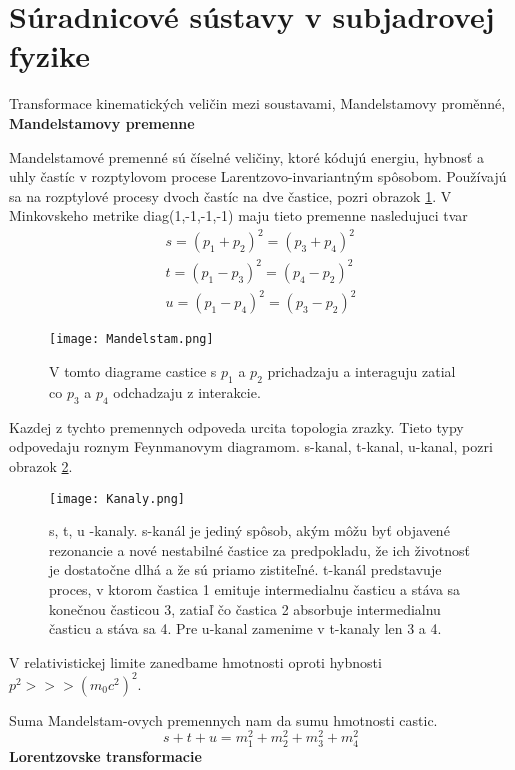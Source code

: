 \documentclass[../../main.tex]{subfiles}
\begin{document}
\section{Súradnicové sústavy v subjadrovej fyzike}
Transformace kinematických veličin mezi soustavami, Mandelstamovy proměnné,\newline
\textbf{Mandelstamovy premenne}\par
Mandelstamové premenné sú číselné veličiny, ktoré kódujú energiu, hybnosť a uhly častíc v rozptylovom procese Larentzovo-invariantným spôsobom. Používajú sa na rozptylové procesy dvoch častíc na dve častice, pozri obrazok \ref{sf1:fig:Mandelstam}. V Minkovskeho metrike diag(1,-1,-1,-1) maju tieto premenne nasledujuci tvar
\begin{equation}
\begin{gathered}
s=(p_1+p_2)^2=(p_3+p_4)^2 \\
t=(p_1-p_3)^2=(p_4-p_2)^2 \\
u=(p_1-p_4)^2=(p_3-p_2)^2
\end{gathered}
\end{equation}
\begin{figure}[!h]
\centering
\texttt{[image: Mandelstam.png]}
\caption{V tomto diagrame castice s $p_1$ a $p_2$ prichadzaju a interaguju zatial co $p_3$ a $p_4$ odchadzaju z interakcie.}
\label{sf1:fig:Mandelstam}
\end{figure}
Kazdej z tychto premennych odpoveda urcita topologia zrazky. Tieto typy odpovedaju roznym Feynmanovym diagramom. s-kanal, t-kanal, u-kanal, pozri obrazok \ref{sf1:fig:Kanaly}.
\begin{figure}[!h]
\centering
\texttt{[image: Kanaly.png]}
\caption{s, t, u -kanaly. s-kanál je jediný spôsob, akým môžu byť objavené rezonancie a nové nestabilné častice za predpokladu, že ich životnosť je dostatočne dlhá a že sú priamo zistiteľné. t-kanál predstavuje proces, v ktorom častica 1 emituje intermedialnu časticu a stáva sa konečnou časticou 3, zatiaľ čo častica 2 absorbuje intermedialnu časticu a stáva sa 4. Pre u-kanal zamenime v t-kanaly len 3 a 4. 
}
\label{sf1:fig:Kanaly}
\end{figure}
\newline
V relativistickej limite zanedbame hmotnosti oproti hybnosti $p^2 >>> (m_0c^2)^2$.\par
Suma Mandelstam-ovych premennych nam da sumu hmotnosti castic. $$ s+t+u=m_1^2+m_2^2+m_3^2+m_4^2 $$\newline
\textbf{Lorentzovske transformacie}\par
\end{document}
